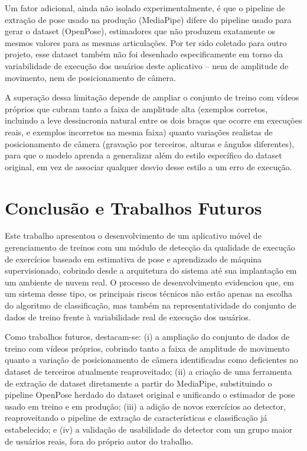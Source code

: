 \documentclass[12pt]{article}
\begin{document}
Um fator adicional, ainda não isolado experimentalmente, é que o pipeline
de extração de pose usado na produção (MediaPipe) difere do pipeline usado
para gerar o dataset (OpenPose), estimadores que não produzem exatamente
os mesmos valores para as mesmas articulações. Por ter sido coletado para
outro projeto, esse dataset também não foi desenhado especificamente em
torno da variabilidade de execução dos usuários deste aplicativo -- nem de
amplitude de movimento, nem de posicionamento de câmera.

A superação dessa limitação depende de ampliar o conjunto de treino com
vídeos próprios que cubram tanto a faixa de amplitude alta (exemplos
corretos, incluindo a leve dessincronia natural entre os dois braços que
ocorre em execuções reais, e exemplos incorretos na mesma faixa) quanto
variações realistas de posicionamento de câmera (gravação por terceiros,
alturas e ângulos diferentes), para que o modelo aprenda a generalizar
além do estilo específico do dataset original, em vez de associar
qualquer desvio desse estilo a um erro de execução.

\section{Conclusão e Trabalhos Futuros}

Este trabalho apresentou o desenvolvimento de um aplicativo móvel de
gerenciamento de treinos com um módulo de detecção da qualidade de
execução de exercícios baseado em estimativa de pose e aprendizado de
máquina supervisionado, cobrindo desde a arquitetura do sistema até sua
implantação em um ambiente de nuvem real. O processo de desenvolvimento
evidenciou que, em um sistema desse tipo, os principais riscos técnicos
não estão apenas na escolha do algoritmo de classificação, mas também na
representatividade do conjunto de dados de treino frente à variabilidade
real de execução dos usuários.

Como trabalhos futuros, destacam-se: (i) a ampliação do conjunto de
dados de treino com vídeos próprios, cobrindo tanto a faixa de amplitude
de movimento quanto a variação de posicionamento de câmera identificadas
como deficientes no dataset de terceiros atualmente reaproveitado; (ii) a
criação de uma
ferramenta de extração de dataset diretamente a partir do MediaPipe,
substituindo o pipeline OpenPose herdado do dataset original e unificando
o estimador de pose usado em treino e em produção; (iii) a adição de novos
exercícios ao detector, reaproveitando o pipeline de extração de
características e classificação já estabelecido; e (iv) a validação de
usabilidade do detector com um grupo maior de usuários reais, fora do
próprio autor do trabalho.



\end{document}
